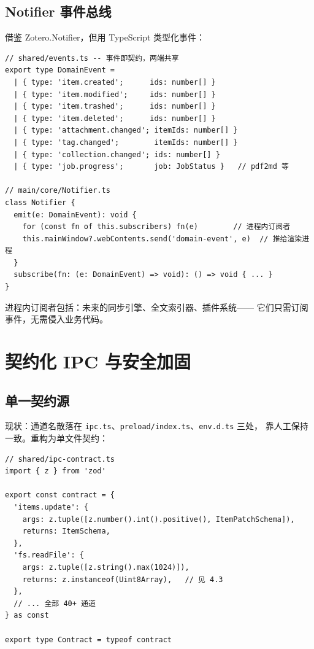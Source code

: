 \documentclass[12pt, a4paper]{article}
\begin{document}
\subsection{Notifier 事件总线}

借鉴 Zotero.Notifier，但用 TypeScript 类型化事件：

\begin{lstlisting}[language={}]
// shared/events.ts -- 事件即契约，两端共享
export type DomainEvent =
  | { type: 'item.created';      ids: number[] }
  | { type: 'item.modified';     ids: number[] }
  | { type: 'item.trashed';      ids: number[] }
  | { type: 'item.deleted';      ids: number[] }
  | { type: 'attachment.changed'; itemIds: number[] }
  | { type: 'tag.changed';        itemIds: number[] }
  | { type: 'collection.changed'; ids: number[] }
  | { type: 'job.progress';       job: JobStatus }   // pdf2md 等

// main/core/Notifier.ts
class Notifier {
  emit(e: DomainEvent): void {
    for (const fn of this.subscribers) fn(e)        // 进程内订阅者
    this.mainWindow?.webContents.send('domain-event', e)  // 推给渲染进程
  }
  subscribe(fn: (e: DomainEvent) => void): () => void { ... }
}
\end{lstlisting}

进程内订阅者包括：未来的同步引擎、全文索引器、插件系统——
它们只需订阅事件，无需侵入业务代码。

\section{契约化 IPC 与安全加固}

\subsection{单一契约源}

现状：通道名散落在 \texttt{ipc.ts}、\texttt{preload/index.ts}、\texttt{env.d.ts} 三处，
靠人工保持一致。重构为单文件契约：

\begin{lstlisting}[language={}]
// shared/ipc-contract.ts
import { z } from 'zod'

export const contract = {
  'items.update': {
    args: z.tuple([z.number().int().positive(), ItemPatchSchema]),
    returns: ItemSchema,
  },
  'fs.readFile': {
    args: z.tuple([z.string().max(1024)]),
    returns: z.instanceof(Uint8Array),   // 见 4.3
  },
  // ... 全部 40+ 通道
} as const

export type Contract = typeof contract
\end{lstlisting}
\end{document}
